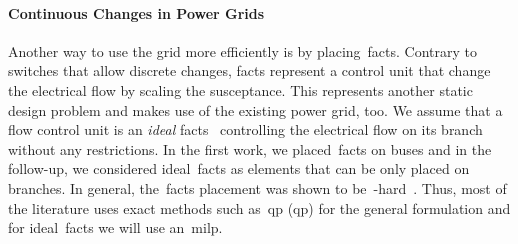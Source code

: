 \paragraph{Continuous Changes in Power Grids}
% 
Another way to use the grid more efficiently is by placing~\gls{facts}. Contrary
to switches that allow discrete changes, \gls{facts} represent a control unit
that change the electrical flow by scaling the susceptance. This represents
another static design problem and makes use of the existing power grid, too. We
assume that a flow control unit is an \emph{ideal}
\gls{facts}~\parencite{julieGriffin} controlling the electrical flow on its
branch without any restrictions. In the first work, we placed~\gls{facts} on
buses and in the follow-up, we considered ideal~\gls{facts} as elements that can
be only placed on branches. In general, the~\gls{facts} placement was shown to
be~\NP-hard~\parencite{Leh16}. Thus, most of the literature uses exact methods
such as~\acrlong{qp} (\acrshort{qp}) for the general formulation and for
ideal~\gls{facts} we will use an~\gls{milp}.

